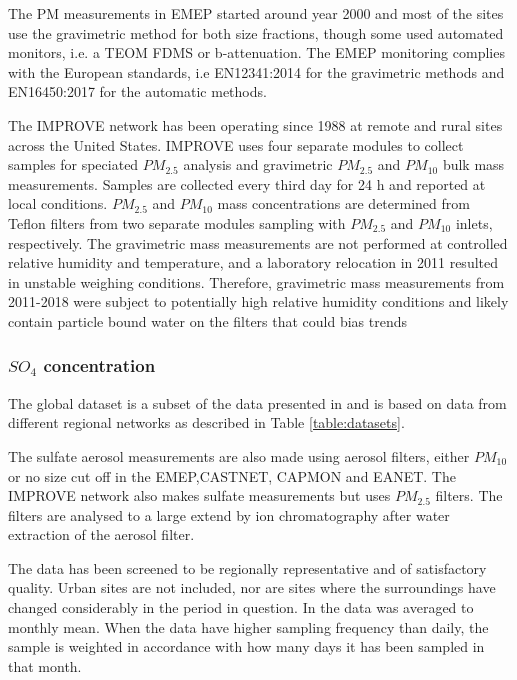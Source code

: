 \documentclass[journal abbreviation, manuscript]{copernicus}
\begin{document}
The PM measurements in EMEP started around year 2000  \citep{torseth2012} and most of the sites use the gravimetric method for both size fractions, though some used automated monitors, i.e. a TEOM FDMS or b-attenuation. The EMEP monitoring complies with the European standards, i.e EN12341:2014 for the gravimetric methods and  EN16450:2017 for the automatic methods. 

The IMPROVE network has been operating since 1988 at remote and rural sites across the United States. IMPROVE uses four separate modules to collect samples for speciated $PM_{2.5}$ analysis and gravimetric $PM_{2.5}$ and $PM_{10}$ bulk mass measurements. Samples are collected every third day for 24 h and reported at local conditions. $PM_{2.5}$ and $PM_{10}$ mass concentrations are determined from Teflon filters from two separate modules sampling with $PM_{2.5}$ and $PM_{10}$ inlets, respectively. The gravimetric mass measurements are not performed at controlled relative humidity and temperature, and a laboratory relocation in 2011 resulted in unstable weighing conditions. Therefore, gravimetric mass measurements from 2011-2018 were subject to potentially high relative humidity conditions and likely contain particle bound water on the filters that could bias trends \citep{Hand2019}



\subsubsection{$SO_{4}$ concentration}
 The global dataset is a subset of the  data presented in \cite{aas2019global} and is based on data from different regional networks as described in Table \ref{table:datasets}.

The sulfate aerosol measurements are also made using aerosol filters, either $PM_{10}$ or no size cut off in the EMEP,CASTNET, CAPMON and EANET.  The IMPROVE network also makes sulfate measurements but uses $PM_{2.5}$ filters. The filters are analysed to a large extend by ion chromatography after water extraction of the aerosol filter.

The data has been screened to be regionally representative and of satisfactory quality. Urban sites are not included, nor are sites where the surroundings have changed considerably in the period in question.
In \cite{aas2019global} the data  was averaged to monthly mean.  When the data have higher sampling frequency than daily, the sample is weighted in accordance with how many days it has been sampled in that month.
\end{document}
